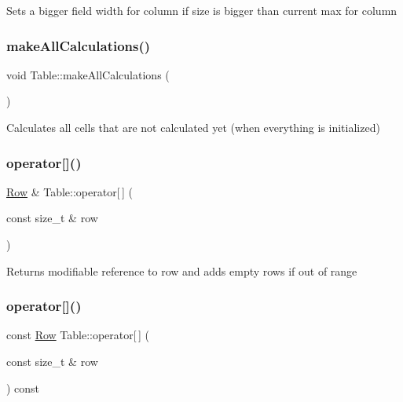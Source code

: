 Sets a bigger field width for column if size is bigger than current max for column \mbox{\label{classTable_a3ea36998494f2f1ea0e7d2d4add7b7d7}} 
\subsubsection{\texorpdfstring{make\+All\+Calculations()}{makeAllCalculations()}}
{\footnotesize\ttfamily void Table\+::make\+All\+Calculations (\begin{DoxyParamCaption}{ }\end{DoxyParamCaption})}

Calculates all cells that are not calculated yet (when everything is initialized) \mbox{\label{classTable_a87e55e477438afdaa491965aee7a8be2}} 
\subsubsection{\texorpdfstring{operator[]()}{operator[]()}\hspace{0.1cm}{\footnotesize\ttfamily [1/2]}}
{\footnotesize\ttfamily \hyperlink{classRow}{Row} \& Table\+::operator\mbox{[}$\,$\mbox{]} (\begin{DoxyParamCaption}\item[{const size\+\_\+t \&}]{row }\end{DoxyParamCaption})}

Returns modifiable reference to row and adds empty rows if out of range \mbox{\label{classTable_a8bcbf5400584f857754e0bc0c97a63ec}} 
\subsubsection{\texorpdfstring{operator[]()}{operator[]()}\hspace{0.1cm}{\footnotesize\ttfamily [2/2]}}
{\footnotesize\ttfamily const \hyperlink{classRow}{Row} Table\+::operator\mbox{[}$\,$\mbox{]} (\begin{DoxyParamCaption}\item[{const size\+\_\+t \&}]{row }\end{DoxyParamCaption}) const}

